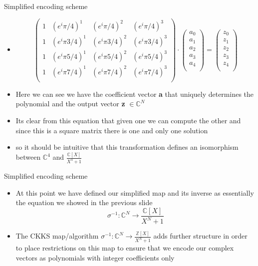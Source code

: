 \documentclass{beamer}
\begin{document}
\begin{frame}{Simplified encoding scheme}
	\begin{itemize}[<+->]
	\item 
		\begin{center}
			\[
			\begin{pmatrix}
				1 & (e^i\pi/4)^1 &  (e^i\pi/4)^2 &  (e^i\pi/4)^3 \\  
				1 & (e^i\pi 3/4)^1 &  (e^i\pi 3/4)^2 &  (e^i\pi 3/4)^3 \\  
				1 & (e^i\pi 5/4)^1 &  (e^i\pi 5/4)^2 &  (e^i\pi 5/4)^3 \\  
				1 & (e^i\pi 7/4)^1 &  (e^i\pi 7/4)^2 &  (e^i\pi 7/4)^3 \\  
			\end{pmatrix} \cdot 
			\begin{pmatrix}
				a_0\\
				a_1\\
				a_2\\
				a_3\\
				a_4\\
			\end{pmatrix} =
			\begin{pmatrix}
				z_0\\
				z_1\\
				z_2\\
				z_3\\
				z_4\\
			\end{pmatrix}
			\]
		\end{center}
		\item Here we can see we have the coefficient vector {\bf a} that uniquely determines the polynomial
		and the output vector {\bf z} $\in \mathbb{C}^N$
		\item Its clear from this equation that given one we can compute the other
		and since this is a square matrix there is one and only one solution
		\item so it should be intuitive that this transformation defines an isomorphism between $\mathbb{C}^4$ and $\frac{\mathbb{C}[X]}{X^4 + 1}$
	\end{itemize}
\end{frame}

\begin{frame}{Simplified encoding scheme}
	\begin{itemize}[<+->]
		\item At this point we have defined our simplified map and its inverse as essentially the equation we showed
		in the previous slide
		$$\sigma^{-1} : \mathbb{C}^N \to \frac{\mathbb{C}[X]}{X^N + 1}$$
		\item The CKKS map/algorithm $\sigma^{-1} : \mathbb{C}^N \to \frac{\mathbb{Z}[X]}{X^N + 1}$ adds further structure
		in order to place restrictions on this map to ensure that we encode our complex vectors as polynomials with
		integer coefficients only
	\end{itemize}
\end{frame}
\end{document}
